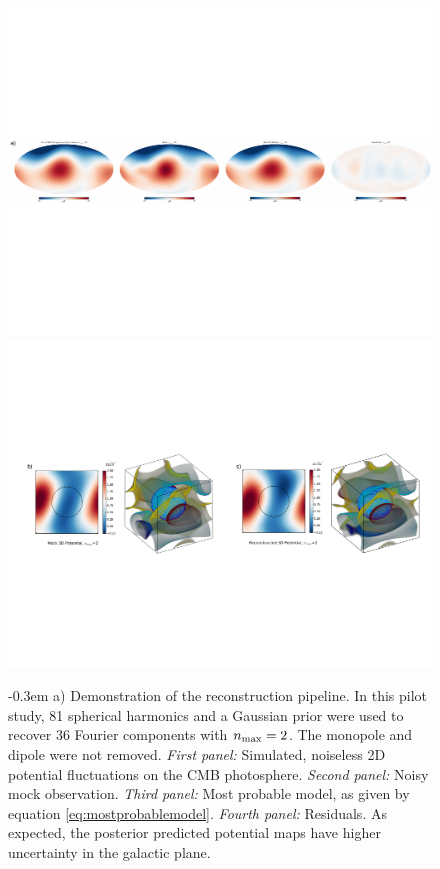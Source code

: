 \documentclass[psfig,12pt]{article}
\begin{document}
{%
\begin{figure}[t]
\centering\includegraphics[width=1.\linewidth]{figures/Reconstruction2D.pdf}
\\
\centering\includegraphics[width=1.\linewidth]{figures/Reconstruction3D-1.pdf}
\caption{
\openup -0.3em
 {\footnotesize
a)  Demonstration of the reconstruction pipeline.  In this pilot study, 81 spherical harmonics and a
Gaussian prior were used to recover 36 Fourier components with
$n_{\rm max}=2$. The monopole and dipole were not removed.
 {\it First panel: } Simulated, noiseless 2D potential fluctuations on the CMB photosphere. {\it Second panel: } Noisy mock observation. {\it Third panel: } Most probable model, as given by equation \ref{eq:mostprobablemodel}. {\it Fourth panel: } Residuals. As expected, the posterior predicted potential maps have higher uncertainty in the galactic plane.
}}
\end{figure}}
\end{document}
